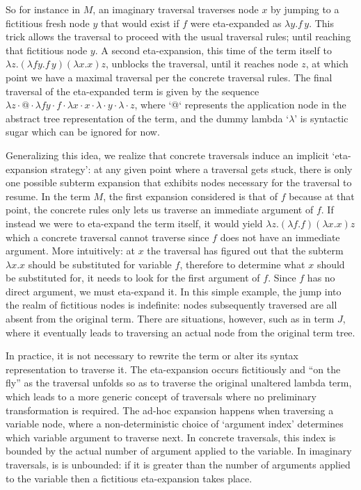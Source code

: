 \documentclass{elsarticle}
\theoremstyle{plain}
\theoremstyle{definition}
\begin{document}
So for instance in $M$, an imaginary traversal traverses node $x$ by jumping to a fictitious fresh node $y$ that would exist if $f$ were eta-expanded
as $\lambda y.f\, y$. This trick allows the traversal to proceed with the usual traversal rules; until reaching that fictitious node $y$.
A second eta-expansion, this time of the term itself to
$\lambda z. (\lambda f y.f\, y)(\lambda x.x) z$,
unblocks the traversal, until it reaches node $z$, at which point we have a maximal traversal per the concrete traversal rules. The final traversal of the eta-expanded term is given by the sequence $\lambda z \cdot @ \cdot \lambda f y \cdot f \cdot \lambda x \cdot x \cdot \lambda \cdot y \cdot \lambda \cdot z$, where `@` represents the application node in the abstract tree representation of the term, and the dummy lambda `$\lambda$' is syntactic sugar which can be ignored for now.

Generalizing this idea, we realize that concrete traversals induce an implicit `eta-expansion strategy': at any given point where a traversal gets stuck, there is only one possible subterm expansion that exhibits nodes necessary for the traversal to resume. In the term $M$, the first expansion considered is that of $f$ because at that point, the concrete rules only lets us
traverse an immediate argument of $f$. If instead we were to eta-expand the term itself, it would yield $\lambda z. (\lambda f .f)(\lambda x.x) z$
which a concrete traversal cannot traverse since $f$ does not have an immediate argument. More intuitively: at $x$ the traversal has figured out that the subterm $\lambda x.x$ should be substituted for variable $f$, therefore to determine what $x$ should be substituted for, it needs to look for the first argument of $f$. Since $f$ has no direct argument, we must eta-expand it. In this simple example, the jump into the realm of fictitious nodes is indefinite: nodes subsequently traversed are all absent from the original term. There are situations, however, such as in term $J$, where it eventually leads to traversing an actual node from the original term tree.

In practice, it is not necessary to rewrite the term or alter its syntax representation to traverse it.
The eta-expansion occurs fictitiously and ``on the fly'' as the traversal unfolds so as to traverse the original unaltered lambda term, which leads to a more generic concept of traversals where no preliminary transformation is required.
%
The ad-hoc expansion happens when traversing a variable node, where a non-deterministic choice of `argument index' determines which variable argument to traverse next. In concrete traversals, this index is bounded by the actual number of argument applied to the variable. In imaginary traversals, is is unbounded: if it is greater than the number of arguments applied to the variable then a fictitious eta-expansion takes place.
\end{document}
